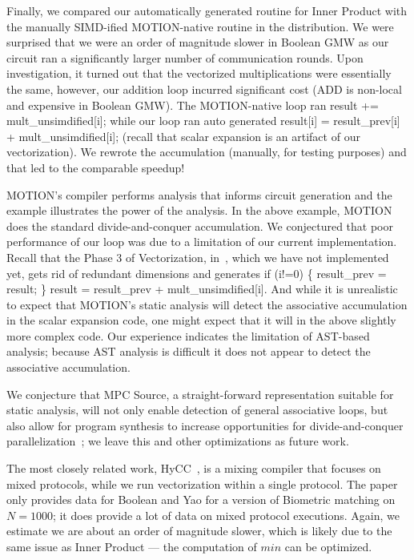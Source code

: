 Finally, we compared our automatically generated routine for Inner Product with the manually SIMD-ified MOTION-native routine in the distribution. 
We were surprised that we were an order of magnitude slower in Boolean GMW as our circuit ran a significantly larger 
number of communication rounds. Upon investigation, it turned out that the vectorized multiplications were essentially the same, 
however, our addition loop incurred significant cost (ADD is non-local and expensive in Boolean GMW). The MOTION-native loop ran 
{\sf result += mult\_unsimdified[i];} while our loop ran auto generated {\sf result[i] = result\_prev[i] + mult\_unsimdified[i];} (recall that scalar expansion
is an artifact of our vectorization). We rewrote the accumulation (manually, for testing purposes) and that led to the comparable speedup!

MOTION's compiler performs analysis that informs circuit generation and the example illustrates the power of the analysis. In the above example, 
MOTION does the standard divide-and-conquer accumulation. We conjectured that poor performance of our loop was due to a
limitation of our current implementation. Recall that the Phase 3 of Vectorization, in~, which we have not implemented yet, gets rid of redundant 
dimensions and generates {\sf if (i!=0) \{ result\_prev = result; \} result = result\_prev + mult\_unsimdified[i]}. And while it is unrealistic to expect that MOTION's static analysis 
will detect the associative accumulation in the scalar expansion code, one might expect that it will in the above slightly more complex code. 
Our experience indicates the limitation of AST-based analysis; because AST analysis is difficult it does not appear to detect the associative accumulation.

We conjecture that MPC Source, a straight-forward representation suitable for static analysis, will not only enable detection of general associative loops, but also allow 
for program synthesis to increase opportunities for divide-and-conquer parallelization~\cite{Farzan:2021}; we leave this and other optimizations as future work. 

The most closely related work, HyCC~\cite{CCS:BDKKS18}, is a mixing compiler that focuses on mixed protocols, while we run vectorization within a single protocol. 
The paper only provides data for Boolean and Yao for a version of Biometric matching on $N=1000$; it does provide a lot of data on mixed protocol executions.
Again, we estimate we are about an order of magnitude slower, which is likely due to the same issue as Inner Product --- the computation of $\mathit{min}$ can be optimized. 




